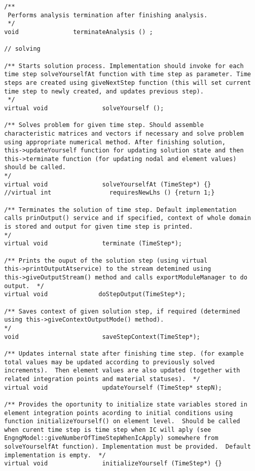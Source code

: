 \documentclass[12pt,draft]{article}
\begin{document}
{\begin{verbatim}
 /**
  Performs analysis termination after finishing analysis.  
  */
 void               terminateAnalysis () ;
  
 // solving

 /** Starts solution process. Implementation should invoke for each
 time step solveYourselfAt function with time step as parameter. Time
 steps are created using giveNextStep function (this will set current
 time step to newly created, and updates previous step).
  */
 virtual void               solveYourself ();

 /** Solves problem for given time step. Should assemble
 characteristic matrices and vectors if necessary and solve problem
 using appropriate numerical method. After finishing solution,
 this->updateYourself function for updating solution state and then
 this->terminate function (for updating nodal and element values)
 should be called.  
 */
 virtual void               solveYourselfAt (TimeStep*) {}
 //virtual int                requiresNewLhs () {return 1;}

 /** Terminates the solution of time step. Default implementation
 calls prinOutput() service and if specified, context of whole domain
 is stored and output for given time step is printed.  
 */
 virtual void               terminate (TimeStep*);

 /** Prints the ouput of the solution step (using virtual
 this->printOutputAtservice) to the stream detemined using
 this->giveOutputStream() method and calls exportModuleManager to do
 output.  */
 virtual void              doStepOutput(TimeStep*);

 /** Saves context of given solution step, if required (determined
 using this->giveContextOutputMode() method).  
 */
 void                       saveStepContext(TimeStep*);

 /** Updates internal state after finishing time step. (for example
 total values may be updated according to previously solved
 increments).  Then element values are also updated (together with
 related integration points and material statuses).  */
 virtual void               updateYourself (TimeStep* stepN);

 /** Provides the oportunity to initialize state variables stored in
 element integration points acording to initial conditions using
 function initializeYourself() on element level.  Should be called
 when curent time step is time step when IC will aply (see
 EngngModel::giveNumberOfTimeStepWhenIcApply) somewhere from
 solveYourselfAt function). Implementation must be provided.  Default
 implementation is empty.  */
 virtual void               initializeYourself (TimeStep*) {}


\end{verbatim}}
\end{document}

